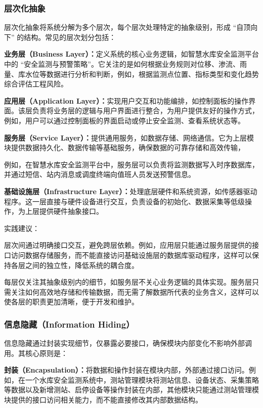 \subsubsection{层次化抽象}\label{sec:hierarchical-abstraction}
层次化抽象将系统分解为多个层次，每个层次处理特定的抽象级别，形成 “自顶向下” 的结构。常见的层次划分包括：

\textbf{业务层（Business Layer）：}定义系统的核心业务逻辑，如智慧水库安全监测平台中的 “安全监测与预警策略”。它关注的是如何根据业务规则对位移、渗流、雨量、库水位等数据进行分析和判断，例如，根据监测点位置、指标类型和变化趋势综合评估工程风险。

\textbf{应用层（Application Layer）：}实现用户交互和功能编排，如控制面板的操作界面。该层负责将业务层的逻辑与用户界面进行整合，为用户提供友好的操作方式，例如，用户可以通过控制面板的界面启动或停止安全监测、查看系统状态等。

\textbf{服务层（Service Layer）：}提供通用服务，如数据存储、网络通信。它为上层模块提供数据持久化、数据传输等基础服务，确保数据的可靠存储和高效传输，

例如，在智慧水库安全监测平台中，服务层可以负责将监测数据写入时序数据库，并通过短信、站内消息或调度终端向值班人员发送预警信息。

\textbf{基础设施层（Infrastructure Layer）：}处理底层硬件和系统资源，如传感器驱动程序。这一层直接与硬件设备进行交互，负责设备的初始化、数据采集等低级操作，为上层提供硬件抽象接口。

实践建议：

层次间通过明确接口交互，避免跨层依赖。例如，应用层只能通过服务层提供的接口访问数据存储服务，而不能直接访问基础设施层的数据库驱动程序，这样可以保持各层之间的独立性，降低系统的耦合度。

每层仅关注其抽象级别内的细节，如服务层不关心业务逻辑的具体实现。服务层只需关注如何高效地存储和传输数据，而无需了解数据所代表的业务含义，这样可以使各层的职责更加清晰，便于开发和维护。

\subsubsection{信息隐藏（Information Hiding）}
信息隐藏通过封装实现细节，仅暴露必要接口，确保模块内部变化不影响外部调用\cite{parnas1972}。其核心原则是：

\textbf{封装（Encapsulation）：}将数据和操作封装在模块内部，外部通过接口访问。例如，在一个水库安全监测系统中，测站管理模块将测站信息、设备状态、采集策略等数据以及新增测站、启停设备等操作封装在内部，其他模块只能通过测站管理模块提供的接口访问相关能力，而不能直接修改其内部数据结构。

